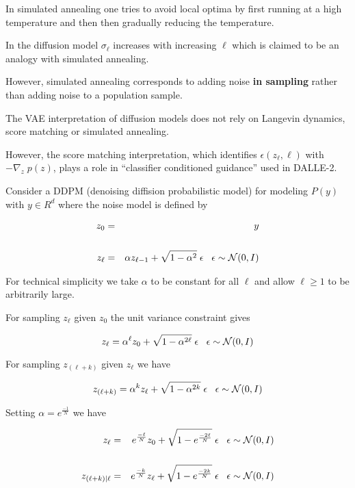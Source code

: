 {

In simulated annealing one tries to avoid local optima by first running at a high temperature and then then gradually reducing the temperature.

\vfill
In the diffusion model $\sigma_\ell$ increases with increasing $\ell$ which is claimed to be an analogy with simulated annealing.

\vfill
However, simulated annealing corresponds to adding noise {\bf in sampling} rather than adding noise to a population sample.


The VAE interpretation of diffusion models does not rely on Langevin dynamics, score matching or simulated annealing.

\vfill
However, the score matching interpretation, which identifies $\epsilon(z_\ell,\ell)$ with $- \nabla_z\; p(z)$,
plays a role in ``classifier conditioned guidance'' used in DALLE-2.


Consider a DDPM (denoising diffision probabilistic model) for modeling $P(y)$ with $y \in R^d$ where the noise model is defined by

\begin{eqnarray*}
  z_0 & = & y \\
  \\
  z_\ell & = & \alpha z_{\ell-1} + \sqrt{1-\alpha^2}\; \epsilon\;\;\;\epsilon\sim {\cal N}(0,I)
\end{eqnarray*}

\vfill
For technical simplicity we take $\alpha$ to be constant for all $\ell$ and allow $\ell \geq 1$ to be arbitrarily large.


For sampling $z_\ell$ given $z_0$ the unit variance constraint gives

\vfill
$$z_\ell = \alpha^\ell z_0 + \sqrt{1 - \alpha^{2\ell}}\;\epsilon \;\;\;\epsilon \sim {\cal N}(0,I)$$

\vfill
For sampling $z_{(\ell+k)}$ given $z_\ell$ we have

\vfill
$$z_{(\ell + k)} = \alpha^k z_\ell + \sqrt{1 - \alpha^{2k}}\;\epsilon \;\;\;\epsilon \sim {\cal N}(0,I)$$


\medskip
Setting $\alpha = e^{\frac{-1}{N}}$ we have


\begin{eqnarray*}
  z_\ell & = & e^{\frac{-\ell}{N}} z_0 + \sqrt{1 - e^{\frac{-2\ell}{N}}}\;\epsilon \;\;\;\epsilon \sim {\cal N}(0,I) \\
  \\
  z_{(\ell + k)|\ell} & = & e^{\frac{-k}{N}} z_\ell + \sqrt{1 - e^{\frac{-2k}{N}}}\;\epsilon \;\;\;\epsilon \sim {\cal N}(0,I)
\end{eqnarray*}

}
